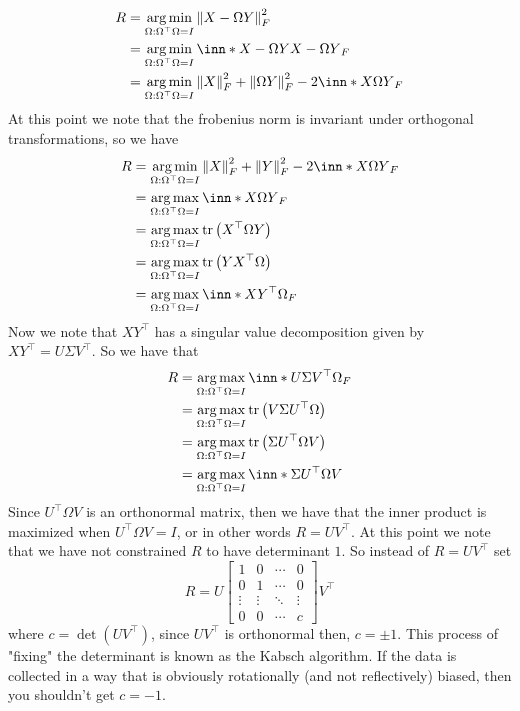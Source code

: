 \documentclass[a4paper]{article}
\DeclareMathOperator*{\argmax}{arg\,max}
\DeclareMathOperator*{\argmin}{arg\,min}
\begin{document}
\[
  \begin{aligned}
    R &= \argmin_{\Omega: \Omega^\top \Omega = I} \norm{X - \Omega Y}_F^2 \\
      &= \argmin_{\Omega: \Omega^\top \Omega = I} \inn*{X - \Omega Y}{X - \Omega Y}_F \\
      &= \argmin_{\Omega: \Omega^\top \Omega = I} \norm{X}_F^2 + \norm{\Omega Y}_F^2 - 2\inn*{X}{\Omega Y}_F \\
  \end{aligned}
\]
At this point we note that the frobenius norm is invariant under orthogonal transformations, so we have
\[
  \begin{aligned}
    R &= \argmin_{\Omega: \Omega^\top \Omega = I} \norm{X}_F^2 + \norm{Y}_F^2 - 2\inn*{X}{\Omega Y}_F \\
      &= \argmax_{\Omega: \Omega^\top \Omega = I} \inn*{X}{\Omega Y}_F \\
      &= \argmax_{\Omega: \Omega^\top \Omega = I} \tr \left( X^\top \Omega Y \right) \\
      &= \argmax_{\Omega: \Omega^\top \Omega = I} \tr \left( YX^\top \Omega \right) \\
      &= \argmax_{\Omega: \Omega^\top \Omega = I} \inn*{XY^\top}{\Omega}_F \\
  \end{aligned}
\]
Now we note that $XY^\top$ has a singular value decomposition given by $XY^\top = U\Sigma V^\top$. So we have that
\[
  \begin{aligned}
    R &= \argmax_{\Omega: \Omega^\top \Omega = I} \inn*{U\Sigma V^\top}{\Omega}_F \\
      &= \argmax_{\Omega: \Omega^\top \Omega = I} \tr \left( V\Sigma U^\top \Omega \right) \\
      &= \argmax_{\Omega: \Omega^\top \Omega = I} \tr \left( \Sigma U^\top \Omega V \right) \\
      &= \argmax_{\Omega: \Omega^\top \Omega = I} \inn*{\Sigma}{U^\top \Omega V} \\
  \end{aligned}
\]
Since $U^\top \Omega V$ is an orthonormal matrix, then we have that the inner product is maximized when $U^\top \Omega V = I$, or in other words $R = UV^\top$. At this point we note that we have not constrained $R$ to have determinant $1$. So instead of $R = UV^\top$ set
\[
  R = U 
  \begin{bmatrix}
    1 & 0 & \cdots & 0 \\
    0 & 1 & \cdots & 0 \\
    \vdots & \vdots & \ddots & \vdots \\
    0 & 0 & \cdots & c
  \end{bmatrix} V^\top
\]
where $c = \det(UV^\top)$, since $UV^\top$ is orthonormal then, $c = \pm 1$. This process of "fixing" the determinant is known as the Kabsch algorithm. If the data is collected in a way that is obviously rotationally (and not reflectively) biased, then you shouldn't get $c = -1$. 
\end{document}
